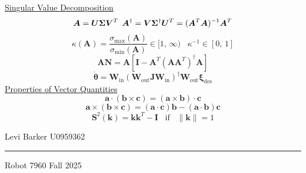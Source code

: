 \documentclass[twocolumn]{article}    %
\begin{document}
\newpage
\noindent\underline{Singular Value Decomposition}
\begin{equation*}
    \bm{A} = \bm{U\Sigma V}^T \hspace{4.5pt} \bm{A}^\dagger = \bm{V\Sigma}^\dagger\bm{U}^T = (\bm{A}^T\bm{A})^{-1}\bm{A}^T
\end{equation*}
\begin{equation*}
    \kappa(\bm{A}) = \frac{\sigma_\text{max}(\bm{A})}{\sigma_\text{min}(\bm{A})} \in [1,\,\infty) \hspace{10pt} \kappa^{-1} \in [0,\,1]
\end{equation*}
\begin{equation*}
    \bm{AN} = \bm{A}[\bm{I} - \bm{A}^T (\bm{AA}^T)^\dagger\bm{A}]
\end{equation*}
\begin{equation*}
    \dot{\bm{\theta}} = \bm{W}_{\text{in}} (\bm{W}_{\text{out}} \bm{J} \bm{W}_{\text{in}})^\dagger \bm{W}_{\text{out}} \bm{\xi}_{\text{des}}
\end{equation*}
\noindent\underline{Properties of Vector Quantities}
\begin{equation*}
    \bm{a}\cdot(\bm{b}\times\bm{c}) = (\bm{a}\times\bm{b})\cdot\bm{c} 
\end{equation*}
\begin{equation*}
    \bm{a}\times(\bm{b}\times\bm{c}) = (\bm{a}\cdot\bm{c})\bm{b} - (\bm{a}\cdot\bm{b})\bm{c}
\end{equation*}
\begin{equation*}
    \bm{S}^2(\bm{k}) = \bm{kk}^T - \bm{I} \hspace{10pt}  \text{if} \hspace{10pt} \|\bm{k}\|= 1
\end{equation*}
\vfill
\begin{center}    
    Levi Barker \hspace{82pt} U0959362 \\ \vspace{2pt}
    \hrule
    \vspace{2pt}
    Robot 7960 \hspace{85pt} Fall 2025
\end{center}
\end{document}
